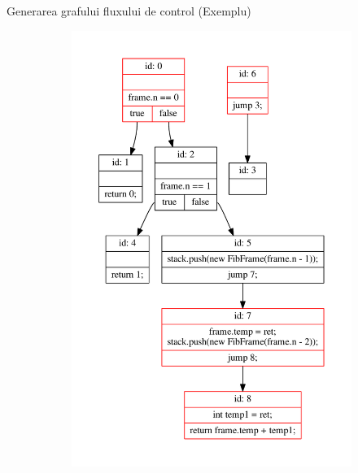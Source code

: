 \documentclass{beamer}
\begin{document}
\begin{frame}{Generarea grafului fluxului de control (Exemplu)}
\begin{figure}[htb]
\begin{subfigure}[b]{.4\textwidth}
            \includegraphics[width=\textwidth]{../../../theses/diploma/src/graph/cfg.pdf}
        \end{subfigure}
    \end{figure}
\end{frame}
\end{document}
